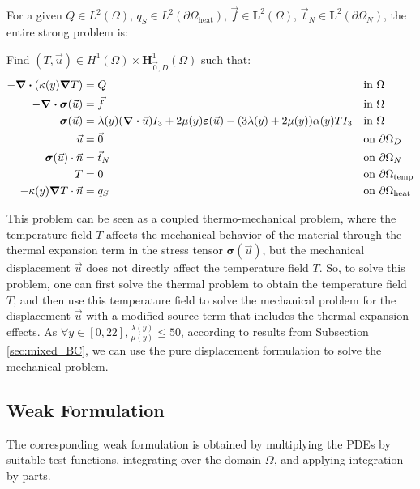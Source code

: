 \documentclass[a4paper,12pt,twoside]{report}
\begin{document}
For a given $Q \in L^2(\Omega)$, $q_S \in L^2(\partial \Omega_{\text{heat}})$, $\vec f \in \boldsymbol L^2(\Omega)$, $\vec t_N \in \boldsymbol L^2(\partial \Omega_N)$, the entire strong problem is:
\begin{tcolorbox}
Find $(T,\vec u) \in H^1(\Omega) \times \boldsymbol H^1_{\vec 0,D}(\Omega)$ such that:
\begin{align}
	- \div (\kappa(y) \grad T) &= Q && \text{in } \Omega \\
	- \div \boldsymbol{\sigma}(\vec u) &= \vec f && \text{in } \Omega \\
	\boldsymbol{\sigma}(\vec u) &= \lambda(y) (\div \vec u) I_3 + 2\mu(y) \boldsymbol{\varepsilon}(\vec u) - (3\lambda(y) + 2\mu(y)) \alpha(y) T I_3 && \text{in } \Omega \\
	\vec u &= \vec 0 && \text{on } \partial\Omega_D \\
	\boldsymbol{\sigma}(\vec u) \cdot \vec n &= \vec t_N && \text{on } \partial\Omega_N \\
	T &= 0 && \text{on } \partial\Omega_{\text{temp}} \\
	-\kappa(y) \grad T \cdot \vec n &= q_S && \text{on } \partial\Omega_{\text{heat}}
\end{align}
\end{tcolorbox}

This problem can be seen as a coupled thermo-mechanical problem, where the temperature field $T$ affects the mechanical behavior of the material through the thermal expansion term in the stress tensor $\boldsymbol{\sigma}(\vec u)$, but the mechanical displacement $\vec u$ does not directly affect the temperature field $T$. So, to solve this problem, one can first solve the thermal problem to obtain the temperature field $T$, and then use this temperature field to solve the mechanical problem for the displacement $\vec u$ with a modified source term that includes the thermal expansion effects. As $\displaystyle \forall y \in [0,22], \frac{\lambda(y)}{\mu(y)} \leq 50$, according to results from Subsection \ref{sec:mixed_BC}, we can use the pure displacement formulation to solve the mechanical problem.

\subsection{Weak Formulation}

The corresponding weak formulation is obtained by multiplying the PDEs by suitable test functions, integrating over the domain $\Omega$, and applying integration by parts.
\end{document}
